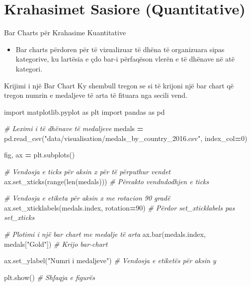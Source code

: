 \documentclass[
  ignorenonframetext,
]{beamer}
\newenvironment{Shaded}{\begin{snugshade}}{\end{snugshade}}
\newcommand{\BuiltInTok}[1]{#1}
\newcommand{\CommentTok}[1]{\textcolor[rgb]{0.56,0.35,0.01}{\textit{#1}}}
\newcommand{\DecValTok}[1]{\textcolor[rgb]{0.00,0.00,0.81}{#1}}
\newcommand{\ImportTok}[1]{#1}
\newcommand{\NormalTok}[1]{#1}
\newcommand{\OperatorTok}[1]{\textcolor[rgb]{0.81,0.36,0.00}{\textbf{#1}}}
\newcommand{\StringTok}[1]{\textcolor[rgb]{0.31,0.60,0.02}{#1}}
\providecommand{\tightlist}{%
  \setlength{\itemsep}{0pt}\setlength{\parskip}{0pt}}
\begin{document}
\hypertarget{krahasimet-sasiore-quantitative}{%
\section{Krahasimet Sasiore
(Quantitative)}\label{krahasimet-sasiore-quantitative}}

\begin{frame}{Bar Charts për Krahasime Kuantitative}
\protect\hypertarget{bar-charts-puxebr-krahasime-kuantitative}{}
\begin{itemize}
\tightlist
\item
  Bar charts përdoren për të vizualizuar të dhëna të organizuara sipas
  kategorive, ku lartësia e çdo bar-i përfaqëson vlerën e të dhënave në
  atë kategori.
\end{itemize}
\end{frame}

\begin{frame}[fragile]{Krijimi i një Bar Chart}
\protect\hypertarget{krijimi-i-njuxeb-bar-chart}{}
Ky shembull tregon se si të krijoni një bar chart që tregon numrin e
medaljeve të arta të fituara nga secili vend.


\begin{Shaded}
\begin{Highlighting}[]
\ImportTok{import}\NormalTok{ matplotlib.pyplot }\ImportTok{as}\NormalTok{ plt}
\ImportTok{import}\NormalTok{ pandas }\ImportTok{as}\NormalTok{ pd}

\CommentTok{\# Leximi i të dhënave të medaljeve}
\NormalTok{medals }\OperatorTok{=}\NormalTok{ pd.read\_csv(}\StringTok{"data/visualisation/medals\_by\_country\_2016.csv"}\NormalTok{, index\_col}\OperatorTok{=}\DecValTok{0}\NormalTok{)}

\NormalTok{fig, ax }\OperatorTok{=}\NormalTok{ plt.subplots()}

\CommentTok{\# Vendosja e ticks për aksin x për të përputhur vendet}
\NormalTok{ax.set\_xticks(}\BuiltInTok{range}\NormalTok{(}\BuiltInTok{len}\NormalTok{(medals)))  }\CommentTok{\# Përcakto vendndodhjen e ticks}

\CommentTok{\# Vendosja e etiketa për aksin x me rotacion 90 gradë}
\NormalTok{ax.set\_xticklabels(medals.index, rotation}\OperatorTok{=}\DecValTok{90}\NormalTok{)  }\CommentTok{\# Përdor set\_xticklabels pas set\_xticks}

\CommentTok{\# Plotimi i një bar chart me medalje të arta}
\NormalTok{ax.bar(medals.index, medals[}\StringTok{"Gold"}\NormalTok{])  }\CommentTok{\# Krijo bar{-}chart}

\NormalTok{ax.set\_ylabel(}\StringTok{"Numri i medaljeve"}\NormalTok{)  }\CommentTok{\# Vendosja e etiketës për aksin y}

\NormalTok{plt.show()  }\CommentTok{\# Shfaqja e figurës}
\end{Highlighting}
\end{Shaded}
\end{frame}
\end{document}
